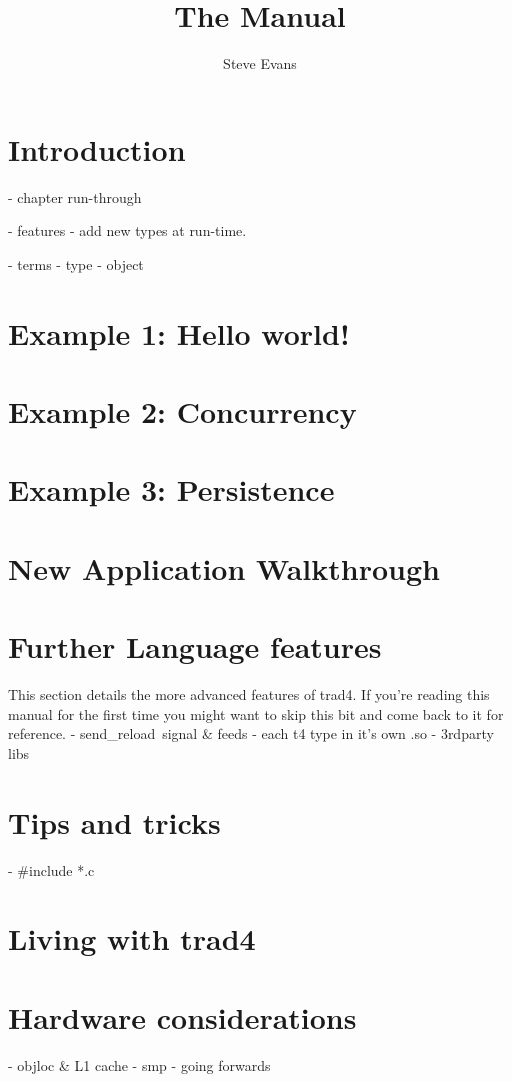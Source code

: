\documentclass{report}
\begin{document}
\title{The Manual}
\author{Steve Evans}
\maketitle

\chapter{Introduction}
- chapter run-through

- features
  - add new types at run-time.

- terms
  - type
  - object


\chapter{Example 1: Hello world!}

\chapter{Example 2: Concurrency}

\chapter{Example 3: Persistence}

\chapter{New Application Walkthrough}

\chapter{Further Language features}

This section details the more advanced features of trad4. If you're reading this manual for the first time you might want to skip this bit and come back to it for reference.
- send_reload signal & feeds
- each t4 type in it's own .so
- 3rdparty libs

\chapter{Tips and tricks}
- #include *.c

\chapter{Living with trad4}

\chapter{Hardware considerations}
- objloc & L1 cache
- smp
- going forwards
\end{document}
